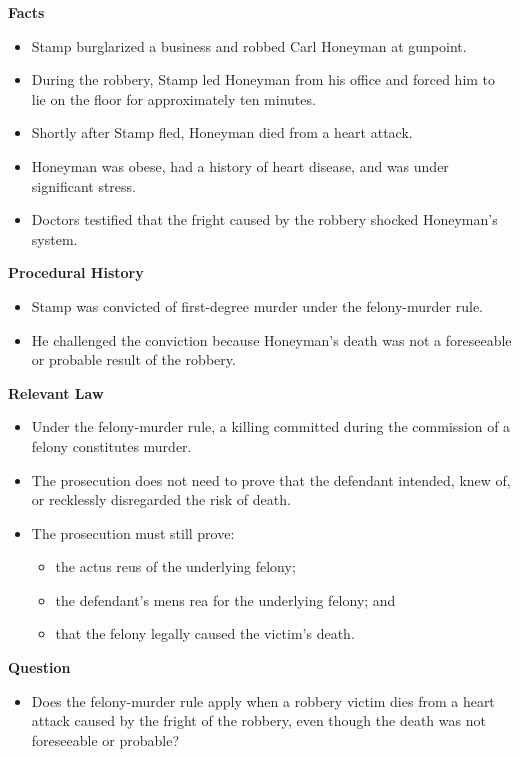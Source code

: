 \documentclass[11pt]{tex/lawoutline}
\begin{document}
    {
        \textbf{Facts}
        \begin{itemize}
            \item Stamp burglarized a business and robbed Carl Honeyman at gunpoint.
            \item During the robbery, Stamp led Honeyman from his office and forced him to lie on the floor for approximately ten minutes.
            \item Shortly after Stamp fled, Honeyman died from a heart attack.
            \item Honeyman was obese, had a history of heart disease, and was under significant stress.
            \item Doctors testified that the fright caused by the robbery shocked Honeyman's system.
        \end{itemize}

        \textbf{Procedural History}
        \begin{itemize}
            \item Stamp was convicted of first-degree murder under the felony-murder rule.
            \item He challenged the conviction because Honeyman's death was not a foreseeable or probable result of the robbery.
        \end{itemize}

        \textbf{Relevant Law}
        \begin{itemize}
            \item Under the felony-murder rule, a killing committed during the commission of a felony constitutes murder.
            \item The prosecution does not need to prove that the defendant intended, knew of, or recklessly disregarded the risk of death.
            \item The prosecution must still prove:
            \begin{itemize}
                \item the actus reus of the underlying felony;
                \item the defendant's mens rea for the underlying felony; and
                \item that the felony legally caused the victim's death.
            \end{itemize}
        \end{itemize}

        \textbf{Question}
        \begin{itemize}
            \item Does the felony-murder rule apply when a robbery victim dies from a heart attack caused by the fright of the robbery, even though the death was not foreseeable or probable?
        \end{itemize}

}
\end{document}
